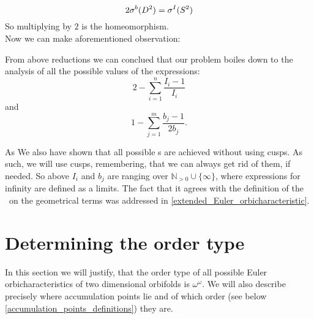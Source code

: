 \begin{equation}\label{times_two_fact}
2{\mathcal{\sigma}^b(D^2)}={\mathcal{\sigma}^I(S^2)}
\end{equation}
So multiplying by $2$ is the homeomorphism. \\[16pt]
Now we can make aforementioned observation:
\begin{observation}\label{boils_down}
From above reductions we can conclued that our problem boiles down to the analysis of all
 the possible 
values of the expressions:
\begin{equation}
2 - \sum_{i=1}^n \frac{I_i-1}{I_i}
\end{equation}
and 
\begin{equation}
1 - \sum_{j=1}^m \frac{b_j-1}{2b_j}.
\end{equation}
\end{observation}
As 
We also have shown that all possible \Eoc s are achieved without using cusps. As such, we will use 
cusps, remembering, that we can always get rid of them, if needed. So above $I_i$ and $b_j$ 
are ranging over $\mathbb{N}_{>0}\cup \{\infty\}$, where expressions for infinity are defined as 
a limits. The fact that it agrees with the definition of the \Eoc\ on the geometrical terms was 
addressed in \ref{extended_Euler_orbicharacteristic}.  
\section{Determining the order type}
In this section we will justify, that the order type of all possible Euler orbicharacteristics 
of two dimensional orbifolds is $\omega^\omega$. 
We will also describe precisely where accumulation points lie and of which order 
(see below \ref{accumulation_points_definitions}) they are.
